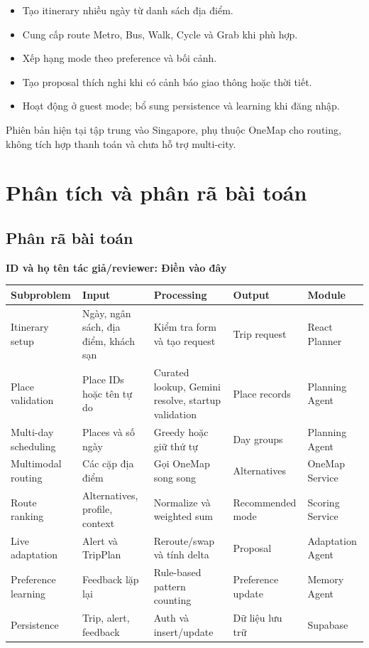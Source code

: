 \documentclass[12pt,a4paper]{article}
\newcommand{\tacgia}{%
  \begin{tcolorbox}[colback=blue!3,colframe=blue!25,boxrule=0.4pt,arc=1mm]
    \small\textbf{ID và họ tên tác giả/reviewer: Điền vào đây}
  \end{tcolorbox}
}
\begin{document}
\begin{itemize}
    \item Tạo itinerary nhiều ngày từ danh sách địa điểm.
    \item Cung cấp route Metro, Bus, Walk, Cycle và Grab khi phù hợp.
    \item Xếp hạng mode theo preference và bối cảnh.
    \item Tạo proposal thích nghi khi có cảnh báo giao thông hoặc thời tiết.
    \item Hoạt động ở guest mode; bổ sung persistence và learning khi đăng nhập.
\end{itemize}

Phiên bản hiện tại tập trung vào Singapore, phụ thuộc OneMap cho routing, không tích hợp thanh toán và chưa hỗ trợ multi-city.

\section{Phân tích và phân rã bài toán}

\subsection{Phân rã bài toán}
\tacgia

\begin{longtable}{|L{2.8cm}|L{2.8cm}|L{4.2cm}|L{2.5cm}|L{2.5cm}|}
\hline
\textbf{Subproblem} & \textbf{Input} & \textbf{Processing} & \textbf{Output} & \textbf{Module} \\ \hline
\endhead
Itinerary setup & Ngày, ngân sách, địa điểm, khách sạn & Kiểm tra form và tạo request & Trip request & React Planner \\ \hline
Place validation & Place IDs hoặc tên tự do & Curated lookup, Gemini resolve, startup validation & Place records & Planning Agent \\ \hline
Multi-day scheduling & Places và số ngày & Greedy hoặc giữ thứ tự & Day groups & Planning Agent \\ \hline
Multimodal routing & Các cặp địa điểm & Gọi OneMap song song & Alternatives & OneMap Service \\ \hline
Route ranking & Alternatives, profile, context & Normalize và weighted sum & Recommended mode & Scoring Service \\ \hline
Live adaptation & Alert và TripPlan & Reroute/swap và tính delta & Proposal & Adaptation Agent \\ \hline
Preference learning & Feedback lặp lại & Rule-based pattern counting & Preference update & Memory Agent \\ \hline
Persistence & Trip, alert, feedback & Auth và insert/update & Dữ liệu lưu trữ & Supabase \\ \hline
\end{longtable}
\end{document}
